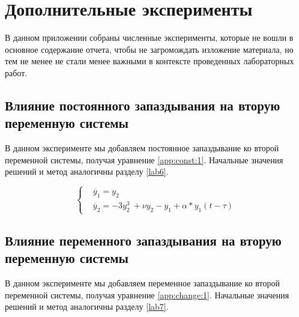 \chapter{Дополнительные эксперименты}\label{app}

В данном приложении собраны численные эксперименты, которые
не вошли в основное содержание отчета, чтобы не загромождать
изложение материала, но тем не менее не стали менее важными
в контексте проведенных лабораторных работ.

\section{Влияние постоянного запаздывания на вторую
переменную системы}\label{app:const}

В данном эксперименте мы добавляем постоянное запаздывание
ко второй переменной системы, получая уравнение \ref{app:const:1}.
Начальные значения решений и метод аналогичны разделу \ref{lab6}.

\begin{equation}\label{app:const:1}
    \begin{cases}
        &\dot{y_1} = y_2\\
        &\dot{y_2} = -3y_2^3\ + \nu y_2 - y_1  + \alpha * y_1(t-\tau)
    \end{cases}
\end{equation}

\clearpage
{}

\clearpage
\section{Влияние переменного запаздывания на вторую
переменную системы}\label{app:changeable}

В данном эксперименте мы добавляем переменное запаздывание
ко второй переменной системы, получая уравнение \ref{app:change:1}.
Начальные значения решений и метод аналогичны разделу \ref{lab7}.

